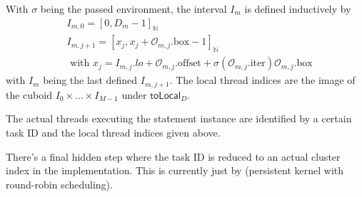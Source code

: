 With $\sigma$ being the passed environment, the interval $I_m$ is defined inductively by
\begin{align}
  & I_{m,0} = [0, D_m - 1]_\mathbb{N} \\
  & I_{m,j+1} = [x_j, x_j + \mathcal{O}_{m,j}.\text{box} - 1]_\mathbb{N} \\
  & \text{  with } x_j = I_{m,j}.lo + \mathcal{O}_{m,j}.\text{offset} + \sigma(\mathcal{O}_{m,j}.\text{iter}) \mathcal{O}_{m,j}.\text{box}
\end{align}
with $I_m$ being the last defined $I_{m,j+1}$.
The local thread indices are the image of the cuboid $I_0 \times ... \times I_{M-1}$ under $\mathsf{toLocal}_D$.

The actual threads executing the statement instance are identified by a certain task ID and the local thread indices given above.

There's a final hidden step where the task ID is reduced to an actual cluster index in the implementation.
This is currently just by  (persistent kernel with round-robin scheduling).



